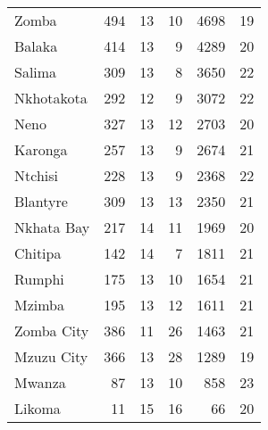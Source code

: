 \begin{tabular}{lrrrrr}
Zomba         &         494 &          13 &           10 &             4698 &          19 \\
Balaka        &         414 &          13 &            9 &             4289 &          20 \\
Salima        &         309 &          13 &            8 &             3650 &          22 \\
Nkhotakota    &         292 &          12 &            9 &             3072 &          22 \\
Neno          &         327 &          13 &           12 &             2703 &          20 \\
Karonga       &         257 &          13 &            9 &             2674 &          21 \\
Ntchisi       &         228 &          13 &            9 &             2368 &          22 \\
Blantyre      &         309 &          13 &           13 &             2350 &          21 \\
Nkhata Bay    &         217 &          14 &           11 &             1969 &          20 \\
Chitipa       &         142 &          14 &            7 &             1811 &          21 \\
Rumphi        &         175 &          13 &           10 &             1654 &          21 \\
Mzimba        &         195 &          13 &           12 &             1611 &          21 \\
Zomba City    &         386 &          11 &           26 &             1463 &          21 \\
Mzuzu City    &         366 &          13 &           28 &             1289 &          19 \\
Mwanza        &          87 &          13 &           10 &              858 &          23 \\
Likoma        &          11 &          15 &           16 &               66 &          20 \\
\bottomrule
\end{tabular}

